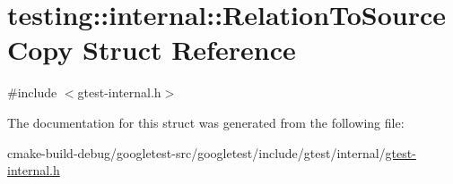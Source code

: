 \hypertarget{structtesting_1_1internal_1_1RelationToSourceCopy}{}\section{testing\+::internal\+::Relation\+To\+Source\+Copy Struct Reference}
\label{structtesting_1_1internal_1_1RelationToSourceCopy}


{\ttfamily \#include $<$gtest-\/internal.\+h$>$}



The documentation for this struct was generated from the following file\+:\begin{DoxyCompactItemize}
\item 
cmake-\/build-\/debug/googletest-\/src/googletest/include/gtest/internal/\mbox{\hyperlink{gtest-internal_8h}{gtest-\/internal.\+h}}\end{DoxyCompactItemize}
